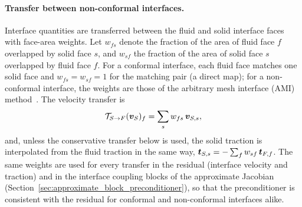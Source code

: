 \paragraph{Transfer between non-conformal interfaces.}
Interface quantities are transferred between the fluid and solid interface faces with face-area weights.
Let $w_{fs}$ denote the fraction of the area of fluid face $f$ overlapped by solid face $s$, and $w_{sf}$ the fraction of the area of solid face $s$ overlapped by fluid face $f$.
For a conformal interface, each fluid face matches one solid face and $w_{fs} = w_{sf} = 1$ for the matching pair (a direct map); for a non-conformal interface, the weights are those of the arbitrary mesh interface (AMI) method~\citep{FarrellMaddison2011}.
The velocity transfer is
\begin{equation}
    \mathcal{T}_{S\to F}(\boldsymbol{v}_S)_f
    =
    \sum_{s} w_{fs}\, \boldsymbol{v}_{S,s},
    \label{eqn:solid_to_fluid_transfer}
\end{equation}
and, unless the conservative transfer below is used, the solid traction is interpolated from the fluid traction in the same way, $\boldsymbol{t}_{S,s} = -\sum_{f} w_{sf}\, \boldsymbol{t}_{F,f}$.
The same weights are used for every transfer in the residual (interface velocity and traction) and in the interface coupling blocks of the approximate Jacobian (Section~\ref{sec:approximate_block_preconditioner}), so that the preconditioner is consistent with the residual for conformal and non-conformal interfaces alike.

